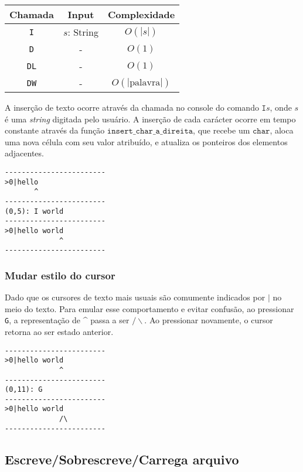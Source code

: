 \documentclass[a4paper, 11pt]{article}
\begin{document}
\begin{table}[H]
\centering
\begin{tabular}{|c|c|c|}
\hline
\textbf{Chamada} & \textbf{Input} & \textbf{Complexidade}
\\ 
\hline
\texttt{I} & $s$: String & $O(|s|)$ \\
\texttt{D} & - & $O(1)$ \\
\texttt{DL} & - & $O(1)$ \\
\texttt{DW} & - & $O(|\text{palavra}|)$ \\
\hline
\end{tabular}
\end{table}

A inserção de texto ocorre através da chamada no console do comando $\texttt{I}s$, onde $s$ é uma \textit{string} digitada pelo usuário. A inserção de cada carácter ocorre em tempo constante através da função $\texttt{insert\_char\_a\_direita}$, que recebe um $\texttt{char}$, aloca uma nova célula com seu valor atribuído, e atualiza os ponteiros dos elementos adjacentes.

\begin{lstlisting}[caption={Exemplo de Inserção de funções}, label={list_exemplo_de_insercao}, language={[ansi]C},firstnumber=1]
------------------------
>0|hello
       ^
------------------------
(0,5): I world
------------------------
>0|hello world
             ^
------------------------
\end{lstlisting}

\subsubsection*{Mudar estilo do cursor}

Dado que os cursores de texto mais usuais são comumente indicados por $\texttt{|}$ no meio do texto. Para emular esse comportamento e evitar confusão, ao pressionar \texttt{G}, a representação de \textasciicircum\,\,passa a ser $/\backslash$. Ao pressionar novamente, o cursor retorna ao ser estado anterior.

\begin{lstlisting}
------------------------
>0|hello world
             ^
------------------------
(0,11): G
------------------------
>0|hello world
             /\
------------------------
\end{lstlisting}

\subsection{Escreve/Sobrescreve/Carrega arquivo}
\end{document}
